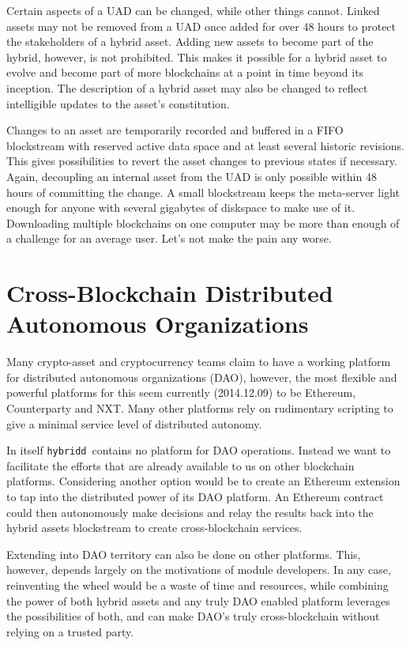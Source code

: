 \documentclass[11pt, a4paper]{article}
\newcommand{\hybridd}{\texttt{hybridd}\, }
\begin{document}
Certain aspects of a UAD can be changed, while other things cannot. Linked assets may not be removed from a UAD once added for over 48 hours to protect the stakeholders of a hybrid asset. Adding new assets to become part of the hybrid, however, is not prohibited. This makes it possible for a hybrid asset to evolve and become part of more blockchains at a point in time beyond its inception. The description of a hybrid asset may also be changed to reflect intelligible updates to the asset's constitution.

Changes to an asset are temporarily recorded and buffered in a FIFO blockstream with reserved active data space and at least several historic revisions. This gives possibilities to revert the asset changes to previous states if necessary. Again, decoupling an internal asset from the UAD is only possible within 48 hours of committing the change. A small blockstream keeps the meta-server light enough for anyone with several gigabytes of diskspace to make use of it. Downloading multiple blockchains on one computer may be more than enough of a challenge for an average user. Let's not make the pain any worse.


\section{Cross-Blockchain Distributed Autonomous Organizations}

Many crypto-asset and cryptocurrency teams claim to have a working platform for distributed autonomous organizations (DAO), however, the most flexible and powerful platforms for this seem currently (2014.12.09) to be Ethereum, Counterparty and NXT. Many other platforms rely on rudimentary scripting to give a minimal service level of distributed autonomy.

In itself \hybridd contains no platform for DAO operations. Instead we want to facilitate the efforts that are already available to us on other blockchain platforms. Considering another option would be to create an Ethereum extension to tap into the distributed power of its DAO platform. An Ethereum contract could then autonomously make decisions and relay the results back into the hybrid assets blockstream to create cross-blockchain services.

Extending into DAO territory can also be done on other platforms. This, however, depends largely on the motivations of module developers. In any case, reinventing the wheel would be a waste of time and resources, while combining the power of both hybrid assets and any truly DAO enabled platform leverages the possibilities of both, and can make DAO's truly cross-blockchain without relying on a trusted party.
\end{document}
